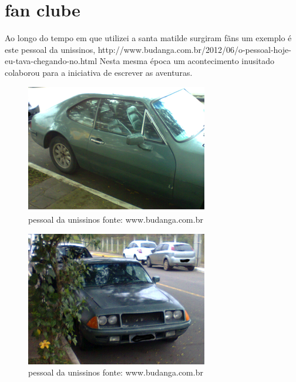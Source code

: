 \documentclass[a4paper]{report}
\begin{document}
\section*{fan clube}
Ao longo do tempo em que utilizei a santa matilde surgiram f\~ans um exemplo \'e este pessoal da unissinos, http://www.budanga.com.br/2012/06/o-pessoal-hoje-eu-tava-chegando-no.html 
Nesta mesma \'epoca um acontecimento inusitado colaborou para a iniciativa de escrever as aventuras.

\begin{figure}[!htb]
\centering
\includegraphics{Foto0296}
\caption{pessoal da unissinos fonte: www.budanga.com.br}
\label{fan clube de S\~ao Leopoldo}
\end{figure}

\begin{figure}[!htb]
\centering
\includegraphics{Foto0295}
\caption{pessoal da unissinos fonte: www.budanga.com.br}
\label{Blog do pessoal da Tecnosinos }
\end{figure}
\clearpage

\end{document}
